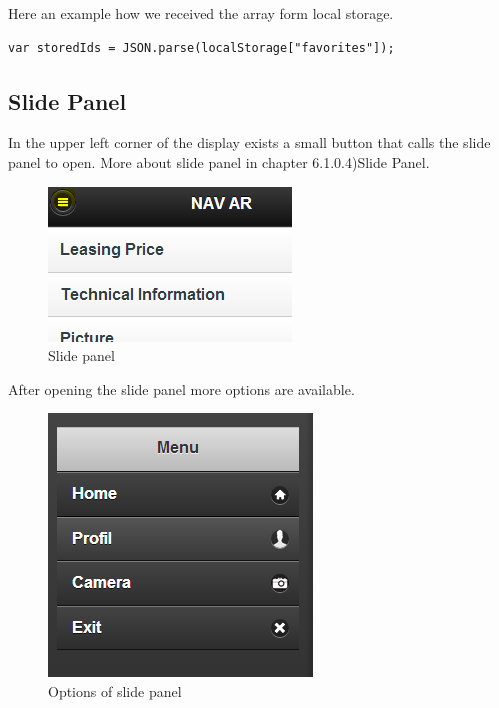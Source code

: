 Here an example how we received the array form local storage.
\\
\begin{lstlisting}[language=html, caption= 
start timer function,captionpos=b]
var storedIds = JSON.parse(localStorage["favorites"]);
\end{lstlisting}

\subsection{Slide Panel}
In the upper left corner of the display exists a small button that calls the slide panel to open. More about slide panel in chapter 6.1.0.4)Slide Panel.
\\

\begin{figure}[h]
\centering
\includegraphics[width=0.5\linewidth]{graphics/chapter4/13}
\caption{Slide panel}
\end{figure}
After opening the slide panel more options are available. 


\begin{figure}[h]
\centering
\includegraphics[width=0.5\linewidth]{graphics/chapter4/14}
\caption{Options of slide panel}
\end{figure}


